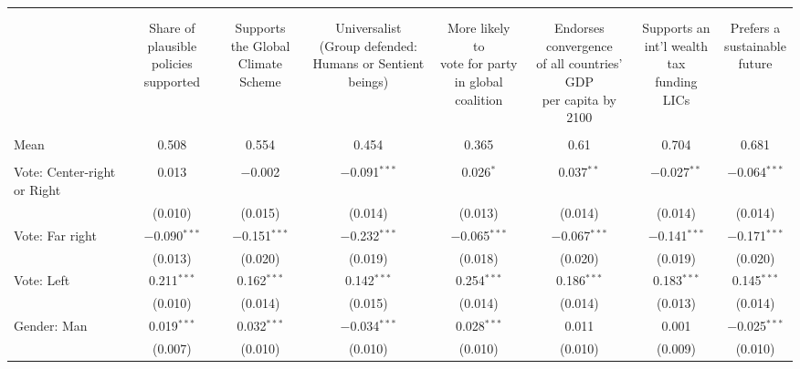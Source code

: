 
\begin{tabular}{@{\extracolsep{5pt}}lccccccc} 
\\[-1.8ex]\hline 
\hline \\[-1.8ex] 
\\[-1.8ex] & \makecell{Share of\\plausible policies\\supported} & \makecell{Supports\\the Global\\Climate Scheme} & \makecell{Universalist\\(Group defended:\\Humans or Sentient beings)} & \makecell{More likely to\\vote for party\\in global coalition} & \makecell{Endorses convergence\\of all countries' GDP\\per capita by 2100} & \makecell{Supports an\\int'l wealth tax\\funding LICs} & \makecell{Prefers a\\sustainable\\future} \\ 
\hline \\[-1.8ex] 
Mean & 0.508 & 0.554 & 0.454 & 0.365 & 0.61 & 0.704 & 0.681  \\ \hline \\[-1.8ex]
 Vote: Center\mbox{-}right or Right & 0.013 & $-$0.002 & $-$0.091$^{***}$ & 0.026$^{*}$ & 0.037$^{**}$ & $-$0.027$^{**}$ & $-$0.064$^{***}$ \\ 
  & (0.010) & (0.015) & (0.014) & (0.013) & (0.014) & (0.014) & (0.014) \\ 
  Vote: Far right & $-$0.090$^{***}$ & $-$0.151$^{***}$ & $-$0.232$^{***}$ & $-$0.065$^{***}$ & $-$0.067$^{***}$ & $-$0.141$^{***}$ & $-$0.171$^{***}$ \\ 
  & (0.013) & (0.020) & (0.019) & (0.018) & (0.020) & (0.019) & (0.020) \\ 
  Vote: Left & 0.211$^{***}$ & 0.162$^{***}$ & 0.142$^{***}$ & 0.254$^{***}$ & 0.186$^{***}$ & 0.183$^{***}$ & 0.145$^{***}$ \\ 
  & (0.010) & (0.014) & (0.015) & (0.014) & (0.014) & (0.013) & (0.014) \\ 
  Gender: Man & 0.019$^{***}$ & 0.032$^{***}$ & $-$0.034$^{***}$ & 0.028$^{***}$ & 0.011 & 0.001 & $-$0.025$^{***}$ \\ 
  & (0.007) & (0.010) & (0.010) & (0.010) & (0.010) & (0.009) & (0.010) \\ 

\end{tabular}

